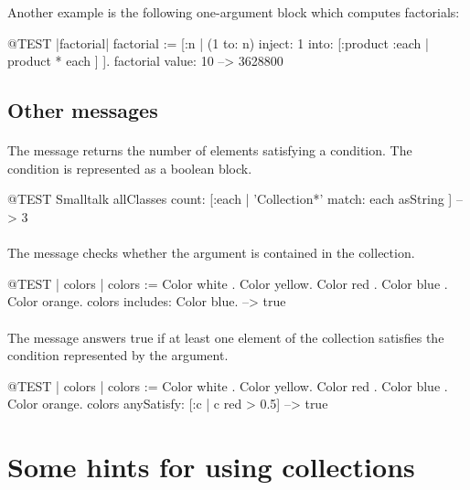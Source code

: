 \documentclass[a4paper,10pt,twoside]{book}
\begin{document}
Another example is the following one-argument block which computes factorials:
\begin{code}{@TEST |factorial|}
factorial := [:n | (1 to: n) inject: 1 into: [:product :each | product * each ] ].
factorial value: 10 --> 3628800
\end{code}

\subsection{Other messages}

\paragraph{} The message  returns the number of elements satisfying a condition.  The condition is represented as a boolean block.

\begin{code}{@TEST}
Smalltalk allClasses count: [:each | 'Collection*' match: each asString ] --> 3
\end{code}

\paragraph{} The message  checks whether the argument is contained in the collection. 

\begin{code}{@TEST | colors |}
colors := {Color white . Color yellow. Color red . Color blue . Color orange}.
colors includes: Color blue. --> true
\end{code}

\paragraph{} The message  answers true if at least one element of the collection satisfies the condition represented by the argument.

\begin{code}{@TEST | colors | colors := {Color white . Color yellow. Color red . Color blue . Color orange}.}
colors anySatisfy: [:c | c red > 0.5] --> true
\end{code}
\section{Some hints for using collections}
\end{document}
